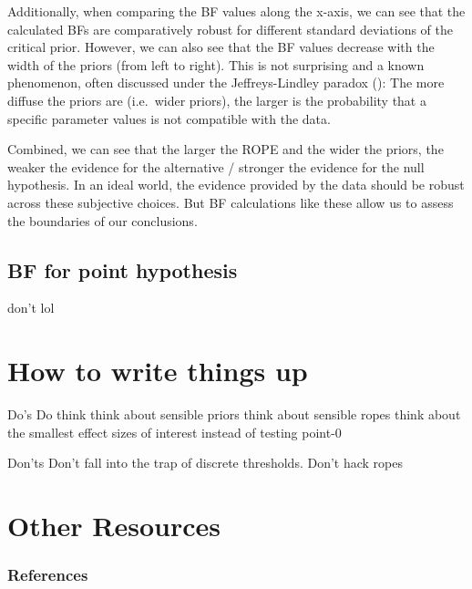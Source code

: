 \documentclass[
  doc,
  longtable,
  nolmodern,
  notxfonts,
  notimes,
  colorlinks=true,linkcolor=blue,citecolor=blue,urlcolor=blue]{apa7}
\begin{document}
Additionally, when comparing the BF values along the x-axis, we can see
that the calculated BFs are comparatively robust for different standard
deviations of the critical prior. However, we can also see that the BF
values decrease with the width of the priors (from left to right). This
is not surprising and a known phenomenon, often discussed under the
Jeffreys-Lindley paradox
():
The more diffuse the priors are (i.e.~wider priors), the larger is the
probability that a specific parameter values is not compatible with the
data.

Combined, we can see that the larger the ROPE and the wider the priors,
the weaker the evidence for the alternative / stronger the evidence for
the null hypothesis. In an ideal world, the evidence provided by the
data should be robust across these subjective choices. But BF
calculations like these allow us to assess the boundaries of our
conclusions.

\subsection{BF for point hypothesis}\label{bf-for-point-hypothesis}

don't lol

\section{How to write things up}\label{how-to-write-things-up}

Do's Do think think about sensible priors think about sensible ropes
think about the smallest effect sizes of interest instead of testing
point-0

Don'ts Don't fall into the trap of discrete thresholds. Don't hack ropes

\section{Other Resources}\label{other-resources}

\subsubsection{References}\label{references}
\end{document}

